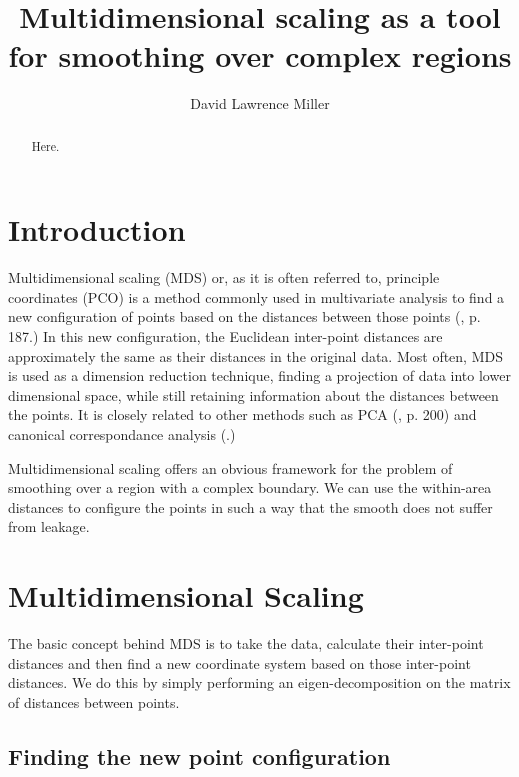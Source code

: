 \documentclass[a4paper,10pt]{amsart}
\title{Multidimensional scaling as a tool for smoothing over complex regions}
\author{David Lawrence Miller}
\begin{document}
 
\begin{abstract}
Here.
\end{abstract}
 
 
\newtheorem{thm}{Theorem}[section]
 
\newtheorem{defn}{Definition}[section]
 
\maketitle


\section{Introduction}

Multidimensional scaling (MDS) or, as it is often referred to, principle coordinates (PCO) is a method commonly used in multivariate analysis to find a new configuration of points based on the distances between those points (\cite{chatfieldcollins}, p. 187.) In this new configuration, the Euclidean inter-point distances are approximately the same as their distances in the original data. Most often, MDS is used as a dimension reduction technique, finding a projection of data into lower dimensional space, while still retaining information about the distances between the points. It is closely related to other methods such as PCA (\cite{chatfieldcollins}, p. 200) and canonical correspondance analysis (\cite{terbraak}.)

Multidimensional scaling offers an obvious framework for the problem of smoothing over a region with a complex boundary. We can use the within-area distances to configure the points in such a way that the smooth does not suffer from leakage.

\section{Multidimensional Scaling}

The basic concept behind MDS is to take the data, calculate their inter-point distances and then find a new coordinate system based on those inter-point distances. We do this by simply performing an eigen-decomposition on the matrix of distances between points.

\subsection{Finding the new point configuration}
\end{document}

